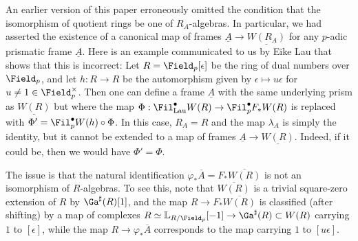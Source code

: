 \documentclass[10pt]{amsart}
\begin{document}
\begin{remark}
   An earlier version of this paper erroneously omitted the condition that the isomorphism of quotient rings be one of $R_A$-algebras. In particular, we had asserted the existence of a canonical map of frames $\underline{A}\to \underline{W(R_A)}$ for any $p$-adic prismatic frame $\underline{A}$. Here is an example communicated to us by Eike Lau that shows that this is incorrect: Let $R=\Field_p[\epsilon]$ be the ring of dual numbers over $\Field_p$, and let $h:R\to R$ be the automorphism given by $\epsilon\mapsto u\epsilon$ for $u\ne 1\in \Field_p^\times$. Then one can define a frame $\underline{A}$ with the same underlying prism as $\underline{W(R)}$ but where the map $\Phi:\Fil^\bullet_{\mathrm{Lau}}W(R)\to \Fil^\bullet_pF_*W(R)$ is replaced with $\Phi' = \Fil^\bullet_pW(h)\circ \Phi$. In this case, $R_A=R$ and the map $\lambda_A$ is simply the identity, but it cannot be extended to a map of frames $\underline{A}\to \underline{W(R)}$. Indeed, if it could be, then we would have $\Phi'=\Phi$. 

   The issue is that the natural identification $\varphi_*\overline{A} = F_*\overline{W(R)}$ is not an isomorphism of $R$-algebras. To see this, note that $\overline{W(R)}$ is a trivial square-zero extension of $R$ by $\Ga^\sharp(R)[1]$, and the map $R\to F_*\overline{W(R)}$ is classified (after shifting) by a map of complexes $ R\simeq \mathbb{L}_{R/\Field_p}[-1]\to \Ga^\sharp(R)\subset W(R)$ carrying $1$ to $[\epsilon]$, while the map $R\to \varphi_*\overline{A}$ corresponds to the map carrying $1$ to $[u\epsilon]$.
\end{remark}
\end{document}
